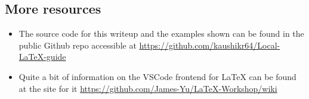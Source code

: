 \subsection{More resources}
\begin{itemize}
    \item 
    The source code for this writeup and the examples shown can be found in the public Github repo accessible at \url{https://github.com/kaushikr64/Local-LaTeX-guide}
    
    \item 
    Quite a bit of information on the VSCode frontend for \LaTeX{} can be found at the site for it \url{https://github.com/James-Yu/LaTeX-Workshop/wiki}
\end{itemize}





%



    